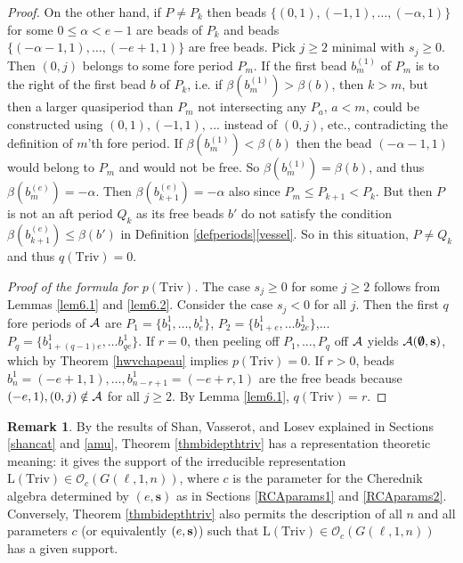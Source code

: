 \documentclass[12pt]{amsart}
\numberwithin{equation}{section}
\theoremstyle{definition}
\newtheorem{remark}[equation]{Remark}
\newcommand{\oh}{\mathcal{O}}
\newcommand{\el}{\mathrm{L}}
\newcommand{\bemp}{\bemptyset}
\newcommand{\mbs}{\mathbf{s}}
\newcommand{\triv}{\mathrm{Triv}}
\begin{document}
\begin{proof}
On the other hand, if $P\neq P_k$ then beads $\{(0,1),(-1,1),\dots,(-\alpha,1)\}$ for some $0\leq \alpha<e-1$ are beads of $P_k$ and beads $\{(-\alpha-1,1),\dots,(-e+1,1)\}$ are free beads. Pick $j\geq 2$ minimal with $s_j\geq 0$. Then $(0,j)$ belongs to some fore period $P_m$. If the first bead $b_m^{(1)}$ of $P_m$ is to the right of the first bead $b$ of $P_k$, i.e. if $\beta(b_m^{(1)})>\beta(b)$, then $k>m$, but then a larger quasiperiod than $P_m$ not intersecting any $P_a$, $a<m$, could be constructed using $(0,1),(-1,1)$, ... instead of $(0,j)$, etc., contradicting the definition of $m$'th fore period. If $\beta(b_m^{(1)})<\beta(b)$ then the bead $(-\alpha-1,1)$ would belong to $P_m$ and would not be free. So $\beta(b_m^{(1)})=\beta(b)$, and thus $\beta(b_m^{(e)})=-\alpha$. Then $\beta(b_{k+1}^{(e)})=-\alpha$ also since $P_m\leq P_{k+1}<P_k$. But then $P$ is not an aft period $Q_k$ as its free beads $b'$ do not satisfy the condition $\beta(b_{k+1}^{(e)})\leq \beta(b')$ in Definition \ref{defperiods}\ref{vessel}. So in this situation, $P\neq Q_k$ and thus $q(\triv)=0$.

\textit{Proof of the formula for $p(\triv)$.} The case $s_j\geq 0$ for some $j\geq2$ follows from Lemmas \ref{lem6.1} and \ref{lem6.2}. Consider the case $s_j<0$ for all $j$. Then the first $q$ fore periods of $\mathcal{A}$ are $P_1=\{b_1^1,\dots, b_e^1\}$, $P_2=\{b_{1+e}^1,\dots b_{2e}^1\}$,... $P_q=\{b_{1+(q-1)e}^1,\dots b_{qe}^1\}$. If $r=0$, then peeling off $P_1,...,P_q$ off $\mathcal{A}$ yields $\cA(\bemp,\mbs)$, which by Theorem \ref{hwvchapeau} implies $p(\triv)=0$. If $r>0$, beads $b_n^1=(-e+1,1),\dots, b_{n-r+1}^1=(-e+r,1)$ are the free beads because $(-e,1),(0,j)\notin\mathcal{A}$ for all $j\geq 2$. By Lemma \ref{lem6.1}, $q(\triv)=r$. 
\end{proof}


\begin{remark}\label{remsupporttriv} 
By the results of Shan, Vasserot, and Losev explained in Sections \ref{shancat} and \ref{amu}, Theorem \ref{thmbidepthtriv}
has a representation theoretic meaning: it gives the support of the irreducible representation $\el(\triv)\in\oh_c(G(\ell,1,n))$,
where $c$ is the parameter for the Cherednik algebra determined by $(e,\mbs)$ as in Sections \ref{RCAparams1} and \ref{RCAparams2}.
Conversely, Theorem \ref{thmbidepthtriv} also permits the description of all $n$ and all parameters $c$ (or equivalently $(e,\mathbf{s})$) 
such that $\el(\triv)\in\oh_c(G(\ell,1,n))$ has a given support.
\end{remark}
\end{document}
